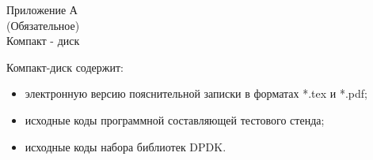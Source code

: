 \begin{center}
Приложение А\\

(Обязательное)\\

Компакт - диск
\end{center}

Компакт-диск содержит: 
\begin{itemize}
\item электронную версию пояснительной записки в форматах *.tex и *.pdf;
\item исходные коды программной составляющей тестового стенда;
\item исходные коды набора библиотек DPDK.
\end{itemize}
 

